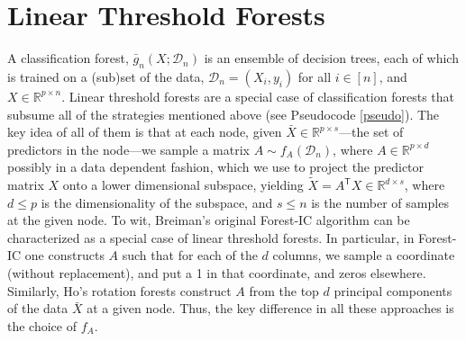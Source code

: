 \documentclass{article} %
\newcommand{\jovo}[1]{{\color{magenta}{\it jovo says: #1}}}
\newcommand{\Real}{\mathbb{R}}
\providecommand{\mc}[1]{\mathcal{#1}}
\providecommand{\mt}[1]{\widetilde{#1}}
\newcommand{\T}{^{\ensuremath{\mathsf{T}}}}           %
\begin{document}



\section{Linear Threshold Forests}

A classification forest, $\bar{g}_n(X; \mc{D}_n)$ is an ensemble of decision trees, each of which is trained on a (sub)set of the data, $\mc{D}_n=(X_i,y_i)$ for all $i \in [n]$, and $X \in \Real^{p \times n}$. Linear threshold forests are a special case of classification forests that subsume all of the strategies mentioned above (see Pseudocode \ref{pseudo}).  The key idea of all of them is that at each node, given $\bar{X} \in \Real^{p \times s}$---the set of predictors in the node---we sample a  matrix $A \sim f_A(\mc{D}_n)$, where $A \in \Real^{p \times d}$ possibly in a data dependent fashion, which we use to project the predictor matrix $X$ onto a lower dimensional subspace, yielding $\mt{X} = A\T X \in \Real^{d \times s}$, where $d \leq p$ is the dimensionality of the subspace, and $s \leq n$ is the number of samples at the given node.  To wit, Breiman's original Forest-IC algorithm can be characterized as a special case of linear threshold forests.  In particular, in Forest-IC one constructs $A$ such that for each of the $d$ columns, we sample a coordinate (without replacement), and put a 1 in that coordinate, and zeros elsewhere. Similarly, Ho's rotation forests construct $A$ from the top $d$ principal components of the data $\bar{X}$ at a given node.  Thus, the key difference in all these approaches is the choice of $f_A$. 
\end{document}
